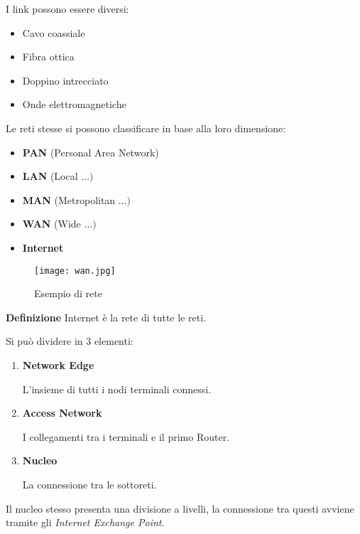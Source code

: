 \documentclass{article}
\begin{document}
\noindent I link possono essere diversi:
\begin{itemize}
    \item Cavo coassiale
    \item Fibra ottica
    \item Doppino intrecciato
    \item Onde elettromagnetiche\newline
\end{itemize}

\noindent Le reti stesse si possono classificare in base alla loro dimensione:
\begin{itemize}
    \item \textbf{PAN} (Personal Area Network)
    \item \textbf{LAN} (Local $\ldots)$
    \item \textbf{MAN} (Metropolitan $\ldots)$
    \item \textbf{WAN} (Wide $\ldots)$
    \item \textbf{Internet}\newline
\end{itemize}

\begin{figure}[ht]
    \centering
    \texttt{[image: wan.jpg]}
    \caption{Esempio di rete}
    \label{fig:net}
\end{figure}

\newpage

\noindent\textbf{Definizione} Internet è la rete di tutte le reti.\newline

\noindent Si può dividere in 3 elementi:
\begin{enumerate}
    \item \textbf{Network Edge}

        L'insieme di tutti i nodi terminali connessi.

    \item \textbf{Access Network}

        I collegamenti tra i terminali e il primo Router.

    \item \textbf{Nucleo}

        La connessione tra le sottoreti.\newline
    
\end{enumerate}

\noindent Il nucleo stesso presenta una divisione a livelli, la connessione tra questi avviene tramite gli \textit{Internet Exchange Point}.\newline
\end{document}
